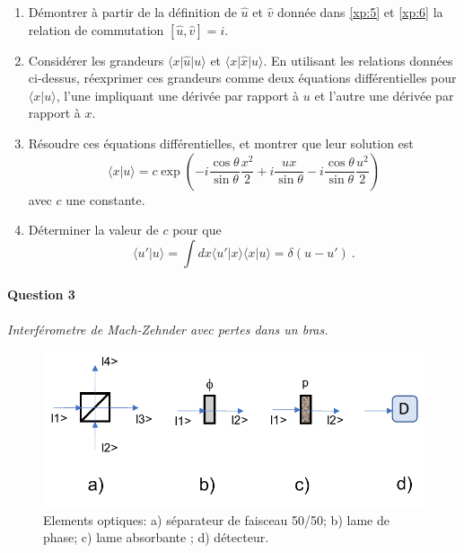 \begin{enumerate}


\item 
Démontrer  à partir de la définition de $\hat u$ et $\hat v$ donnée dans  \eqref{xp:5} et \eqref{xp:6} la relation de commutation  $[\hat u, \hat v ] = i$.

\item
Considérer les grandeurs $\langle x \vert \hat u \vert u\rangle $ et $\langle x \vert \hat x \vert u\rangle$. En utilisant les relations données ci-dessus, réexprimer ces grandeurs comme deux équations différentielles pour $\langle x \vert u\rangle$, l'une impliquant une dérivée par rapport à $u$ et l'autre une dérivée par rapport à $x$.

\item
Résoudre ces équations différentielles, et montrer que leur solution est
\begin{equation}
\langle x \vert u \rangle =  c  \exp \left( - i \frac{\cos \theta}{\sin \theta}\frac{x^2}{2} + i \frac{u x}{\sin \theta} - i \frac{\cos \theta}{\sin \theta}\frac{u^2}{2} \right)
\end{equation}
avec $c$ une constante.

\item
Déterminer la valeur de $c$ pour que 
\begin{equation}
\langle u' \vert u \rangle = \int dx \langle u' \vert x \rangle \langle x \vert u \rangle = \delta (u - u') \ .
\end{equation}
\end{enumerate}

\paragraph{Question 3} \textit{Interférometre de Mach-Zehnder avec pertes dans un bras.} \\

\begin{figure}[h!]
\begin{center}
\includegraphics[scale=0.9]{Pictures/Fig-Optique.pdf} 
\end{center}
\caption{Elements optiques: a) séparateur de faisceau 50/50; b) lame de phase; c) lame absorbante ; d) détecteur.}
\label{fig:Optique}
\end{figure}

